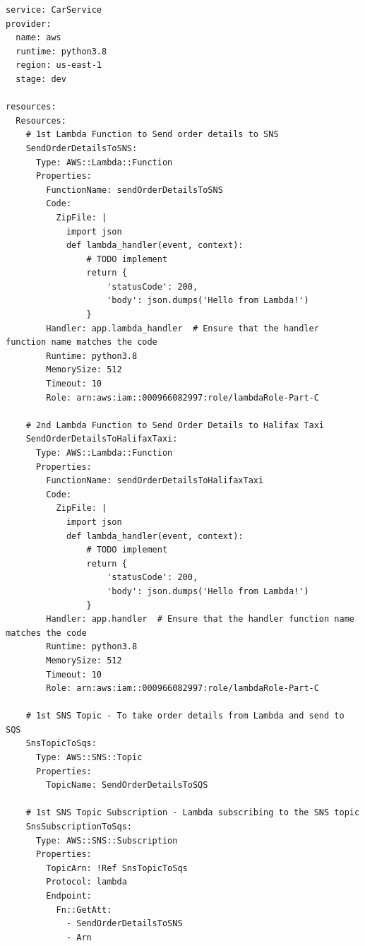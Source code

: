 \begin{enumerate}


\begin{mdframed}[linewidth=1pt]
\lstset{language=YAML}
\begin{lstlisting}[basicstyle=\ttfamily\small, breaklines=true]
service: CarService
provider:
  name: aws
  runtime: python3.8
  region: us-east-1  
  stage: dev 

resources:
  Resources:
    # 1st Lambda Function to Send order details to SNS 
    SendOrderDetailsToSNS:
      Type: AWS::Lambda::Function
      Properties:
        FunctionName: sendOrderDetailsToSNS
        Code:
          ZipFile: | 
            import json
            def lambda_handler(event, context):
                # TODO implement
                return {
                    'statusCode': 200,
                    'body': json.dumps('Hello from Lambda!')
                }
        Handler: app.lambda_handler  # Ensure that the handler function name matches the code
        Runtime: python3.8
        MemorySize: 512
        Timeout: 10
        Role: arn:aws:iam::000966082997:role/lambdaRole-Part-C

    # 2nd Lambda Function to Send Order Details to Halifax Taxi
    SendOrderDetailsToHalifaxTaxi:
      Type: AWS::Lambda::Function
      Properties:
        FunctionName: sendOrderDetailsToHalifaxTaxi
        Code:
          ZipFile: |
            import json
            def lambda_handler(event, context):
                # TODO implement
                return {
                    'statusCode': 200,
                    'body': json.dumps('Hello from Lambda!')
                }
        Handler: app.handler  # Ensure that the handler function name matches the code
        Runtime: python3.8
        MemorySize: 512
        Timeout: 10
        Role: arn:aws:iam::000966082997:role/lambdaRole-Part-C

    # 1st SNS Topic - To take order details from Lambda and send to SQS
    SnsTopicToSqs:
      Type: AWS::SNS::Topic
      Properties:
        TopicName: SendOrderDetailsToSQS

    # 1st SNS Topic Subscription - Lambda subscribing to the SNS topic
    SnsSubscriptionToSqs:
      Type: AWS::SNS::Subscription
      Properties:
        TopicArn: !Ref SnsTopicToSqs
        Protocol: lambda
        Endpoint:
          Fn::GetAtt:
            - SendOrderDetailsToSNS
            - Arn


\end{lstlisting}
\end{mdframed}
\end{enumerate}
